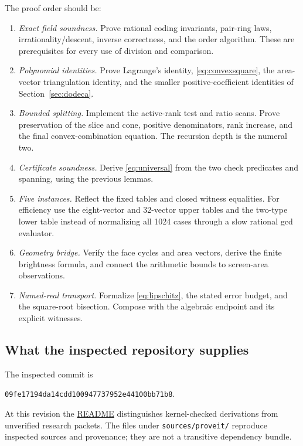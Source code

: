 \documentclass[11pt,a4paper]{article}
\newcommand{\code}[1]{\texttt{#1}}
\begin{document}
The proof order should be:
\begin{enumerate}
\item \emph{Exact field soundness.} Prove rational coding invariants, pair-ring laws, irrationality/descent, inverse correctness, and the order algorithm. These are prerequisites for every use of division and comparison.
\item \emph{Polynomial identities.} Prove Lagrange's identity, \eqref{eq:convexsquare}, the area-vector triangulation identity, and the smaller positive-coefficient identities of Section~\ref{sec:dodeca}.
\item \emph{Bounded splitting.} Implement the active-rank test and ratio scans. Prove preservation of the slice and cone, positive denominators, rank increase, and the final convex-combination equation. The recursion depth is the numeral two.
\item \emph{Certificate soundness.} Derive \eqref{eq:universal} from the two check predicates and spanning, using the previous lemmas.
\item \emph{Five instances.} Reflect the fixed tables and closed witness equalities. For efficiency use the eight-vector and 32-vector upper tables and the two-type lower table instead of normalizing all 1024 cases through a slow rational gcd evaluator.
\item \emph{Geometry bridge.} Verify the face cycles and area vectors, derive the finite brightness formula, and connect the arithmetic bounds to screen-area observations.
\item \emph{Named-real transport.} Formalize \eqref{eq:lipschitz}, the stated error budget, and the square-root bisection. Compose with the algebraic endpoint and its explicit witnesses.
\end{enumerate}

\subsection{What the inspected repository supplies}
The inspected commit is
\begin{center}\small\code{09fe17194da14cdd100947737952e44100bb71b8}.\end{center}
At this revision the \href{https://github.com/VladimirReshetnikov/ProveIt/blob/09fe17194da14cdd100947737952e44100bb71b8/Logic/PrimitiveRecursiveArithmetic/README.md}{README} distinguishes kernel-checked derivations from unverified research packets. The files under \code{sources/proveit/} reproduce inspected sources and provenance; they are not a transitive dependency bundle.
\end{document}
